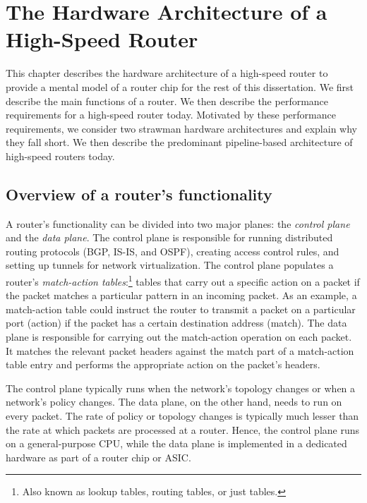 \section{The Hardware Architecture of a High-Speed Router}
\label{s:router_arch}

This chapter describes the hardware architecture of a high-speed router to
provide a mental model of a router chip for the rest of this dissertation. We
first describe the main functions of a router. We then describe the performance
requirements for a high-speed router today. Motivated by these performance
requirements, we consider two strawman hardware architectures and explain why
they fall short. We then describe the predominant pipeline-based architecture
of high-speed routers today.

\subsection{Overview of a router's functionality}

A router's functionality can be divided into two major planes: the {\em control
plane} and the {\em data plane}. The control plane is responsible for running
distributed routing protocols (\eg BGP, IS-IS, and OSPF), creating access
control rules, and setting up tunnels for network virtualization. The control
plane populates a router's {\em match-action tables}:\footnote{Also known as
lookup tables, routing tables, or just tables.} tables that carry out a
specific action on a packet if the packet matches a particular pattern in an
incoming packet. As an example, a match-action table could instruct the router
to transmit a packet on a particular port (action) if the packet has a certain
destination address (match). The data plane is responsible for carrying out the
match-action operation on each packet. It matches the relevant packet headers
against the match part of a match-action table entry and performs the
appropriate action on the packet's headers.

The control plane typically runs when the network's topology changes or when a
network's policy changes. The data plane, on the other hand, needs to run on
every packet. The rate of policy or topology changes is typically much lesser
than the rate at which packets are processed at a router. Hence, the control
plane runs on a general-purpose CPU, while the data plane is implemented in a
dedicated hardware as part of a router chip or ASIC.

